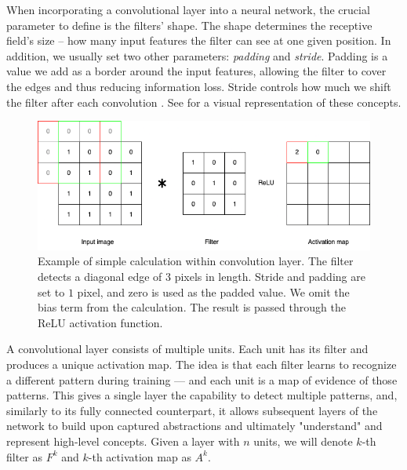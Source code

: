 When incorporating a convolutional layer into a neural network, the crucial parameter to define is the filters' shape.
The shape determines the receptive field's size -- how many input features the filter can see at one given position.
In addition, we usually set two other parameters: \emph{padding} and \emph{stride}.
Padding is a value we add as a border around the input features, allowing the filter to cover the edges and thus reducing information loss.
Stride controls how much we shift the filter after each convolution \cite{cnns}.
See  for a visual representation of these concepts.


\begin{figure}
    \begin{center}
    \begin{minipage}{0.75\textwidth}
      \includegraphics[width=\textwidth]{img/cnn-conv.png}
    \end{minipage}
    \caption{Example of simple calculation within convolution layer. The filter detects a diagonal edge of 3 pixels in length. Stride and padding are set to $1$ pixel, and zero is used as the padded value. We omit the bias term from the calculation. The result is passed through the ReLU activation function.}
    \label{fig:cnn-convolution}
    \end{center}
\end{figure}

A convolutional layer consists of multiple units.
Each unit has its filter and produces a unique activation map.
The idea is that each filter learns to recognize a different pattern during training --- and each unit is a map of evidence of those patterns.
This gives a single layer the capability to detect multiple patterns, and, similarly to its fully connected counterpart, it allows subsequent layers of the network to build upon captured abstractions and ultimately "understand" and represent high-level concepts.
Given a layer with $n$ units, we will denote $k$-th filter as $F^k$ and $k$-th activation map as $A^k$.

